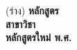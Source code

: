 \pagestyle{empty}
\begin{center}
(ร่าง)\vfill\vspace{-3cm}
{\bfseries \LARGE
หลักสูตร\thdegree\\
สาขาวิชา\thdegreebranch\\[5mm]
หลักสูตรใหม่ พ.ศ. \bdyear
}
\vfill
{\Large
\department\\
\faculty\\
\univerity\\
}
\end{center}